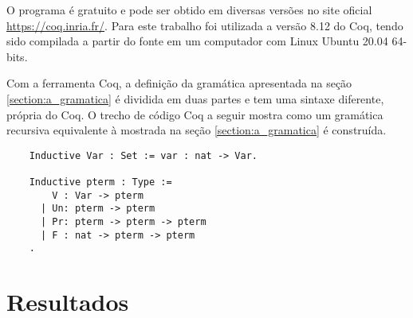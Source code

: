 \documentclass{article}
\begin{document}
O programa é gratuito e pode ser obtido em diversas versões no site oficial
\url{https://coq.inria.fr/}. Para este trabalho foi utilizada a versão 8.12 do Coq, tendo sido
compilada a partir do fonte em um computador com Linux Ubuntu 20.04 64-bits.

Com a ferramenta Coq, a definição da gramática apresentada na seção \ref{section:a_gramatica} é
dividida em duas partes e tem uma sintaxe diferente, própria do Coq. O trecho de código Coq a seguir
mostra como um gramática recursiva equivalente à mostrada na seção \ref{section:a_gramatica} é
construída.

\begin{verbatim}
	Inductive Var : Set := var : nat -> Var.

	Inductive pterm : Type :=
		V : Var -> pterm
	  | Un: pterm -> pterm
	  | Pr: pterm -> pterm -> pterm
	  | F : nat -> pterm -> pterm
	.
\end{verbatim}

\section{Resultados}
\label{section:resultados}
\end{document}
